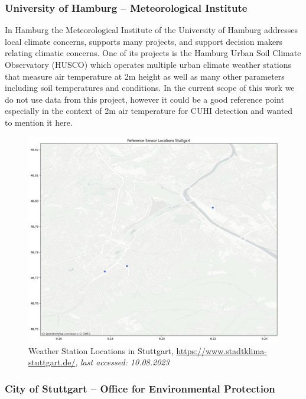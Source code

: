 \subsubsection{University of Hamburg – Meteorological Institute}

In Hamburg the Meteorological Institute of the University of Hamburg addresses local climate concerns, supports many projects, and support decision makers relating climatic concerns. One of its projects is the Hamburg Urban Soil Climate Observatory (HUSCO) which operates multiple urban climate weather stations that measure air temperature at 2m height as well as many other parameters including soil temperatures and conditions. In the current scope of this work we do not use data from this project, however it could be a good reference point especially in the context of 2m air temperature for CUHI detection and wanted to mention it here.

\begin{figure}[ht]
    \centering
    \includegraphics[width=1\textwidth]{images/afu_stuttgart_sensor_locations.png}
    \caption{Weather Station Locations in Stuttgart, \url{https://www.stadtklima-stuttgart.de/}, \textit{last accessed: 10.08.2023}}
    \label{fig:afu weather station locations}
\end{figure}

\subsubsection{City of Stuttgart – Office for Environmental Protection}

